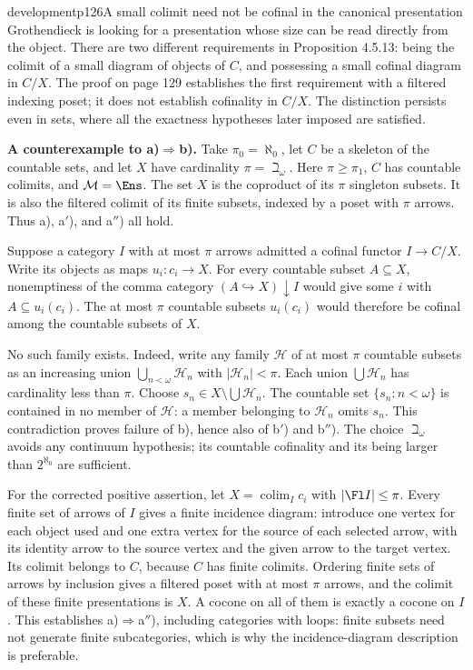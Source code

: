 \begin{dcomment}{development}{p126}{A small colimit need not be cofinal in the canonical presentation}
Grothendieck is looking for a presentation whose size can be read directly from the object. There are two different requirements in Proposition 4.5.13: being the colimit of a small diagram of objects of $C$, and possessing a small cofinal diagram in $C/X$. The proof on page 129 establishes the first requirement with a filtered indexing poset; it does not establish cofinality in $C/X$. The distinction persists even in sets, where all the exactness hypotheses later imposed are satisfied.

\textbf{A counterexample to a)$\Rightarrow$b).}\ours{}
Take $\pi_0=\aleph_0$, let $C$ be a skeleton of the countable sets, and let $X$ have cardinality $\pi=\beth_\omega$. Here $\pi\geq\pi_1$, $C$ has countable colimits, and $\mathcal M=\Ens$. The set $X$ is the coproduct of its $\pi$ singleton subsets. It is also the filtered colimit of its finite subsets, indexed by a poset with $\pi$ arrows. Thus a), a$'$), and a$''$) all hold.

Suppose a category $I$ with at most $\pi$ arrows admitted a cofinal functor $I\to C/X$. Write its objects as maps $u_i:c_i\to X$. For every countable subset $A\subseteq X$, nonemptiness of the comma category $(A\hookrightarrow X)\downarrow I$ would give some $i$ with $A\subseteq u_i(c_i)$. The at most $\pi$ countable subsets $u_i(c_i)$ would therefore be cofinal among the countable subsets of $X$.

No such family exists. Indeed, write any family $\mathcal H$ of at most $\pi$ countable subsets as an increasing union $\bigcup_{n<\omega}\mathcal H_n$ with $|\mathcal H_n|<\pi$. Each union $\bigcup\mathcal H_n$ has cardinality less than $\pi$. Choose $s_n\in X\setminus\bigcup\mathcal H_n$. The countable set $\{s_n:n<\omega\}$ is contained in no member of $\mathcal H$: a member belonging to $\mathcal H_n$ omits $s_n$. This contradiction proves failure of b), hence also of b$'$) and b$''$). The choice $\beth_\omega$ avoids any continuum hypothesis; its countable cofinality and its being larger than $2^{\aleph_0}$ are sufficient.

For the corrected positive assertion, let $X=\operatorname{colim}_I c_i$ with $|\Fl I|\leq\pi$. Every finite set of arrows of $I$ gives a finite incidence diagram: introduce one vertex for each object used and one extra vertex for the source of each selected arrow, with its identity arrow to the source vertex and the given arrow to the target vertex. Its colimit belongs to $C$, because $C$ has finite colimits. Ordering finite sets of arrows by inclusion gives a filtered poset with at most $\pi$ arrows, and the colimit of these finite presentations is $X$. A cocone on all of them is exactly a cocone on $I$. This establishes a)$\Rightarrow$a$''$), including categories with loops: finite subsets need not generate finite subcategories, which is why the incidence-diagram description is preferable.


\end{dcomment}
